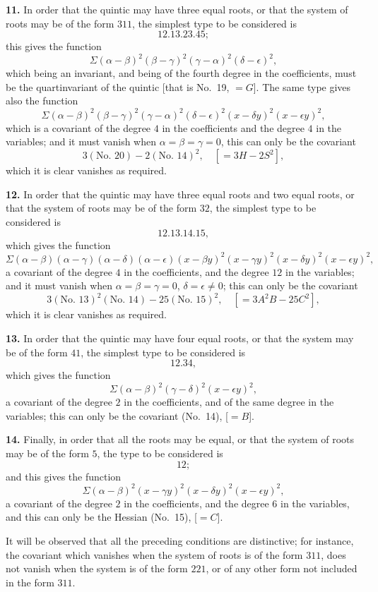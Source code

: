 \documentclass[11pt,a4paper]{book}
\begin{document}
\begin{center}
\medskip
\noindent\textbf{11.} In order that the quintic may have three equal roots, or that the system of roots may be of the form $311$, the simplest type to be considered is
\[12.13.23.45;\]
this gives the function
\[
\Sigma(\alpha-\beta)^2(\beta-\gamma)^2(\gamma-\alpha)^2(\delta-\epsilon)^2,
\]
which being an invariant, and being of the fourth degree in the coefficients, must be the quartinvariant of the quintic [that is No.~19, $=G$]. The same type gives also the function
\[
\Sigma(\alpha-\beta)^2(\beta-\gamma)^2(\gamma-\alpha)^2(\delta-\epsilon)^2(x-\delta y)^2(x-\epsilon y)^2,
\]
which is a covariant of the degree $4$ in the coefficients and the degree $4$ in the variables; and it must vanish when $\alpha=\beta=\gamma=0$, this can only be the covariant
\[3(\text{No.~20}) - 2(\text{No.~14})^2, \quad [= 3H - 2S^2],\]
which it is clear vanishes as required.

\medskip
\noindent\textbf{12.} In order that the quintic may have three equal roots and two equal roots, or that the system of roots may be of the form $32$, the simplest type to be considered is
\[12.13.14.15,\]
which gives the function
\[
\Sigma(\alpha-\beta)(\alpha-\gamma)(\alpha-\delta)(\alpha-\epsilon)(x-\beta y)^2(x-\gamma y)^2(x-\delta y)^2(x-\epsilon y)^2,
\]
a covariant of the degree $4$ in the coefficients, and the degree $12$ in the variables; and it must vanish when $\alpha=\beta=\gamma=0$, $\delta=\epsilon\neq 0$; this can only be the covariant
\[3(\text{No.~13})^2(\text{No.~14}) - 25(\text{No.~15})^2, \quad [= 3A^2B - 25C^2],\]
which it is clear vanishes as required.

\medskip
\noindent\textbf{13.} In order that the quintic may have four equal roots, or that the system may be of the form $41$, the simplest type to be considered is
\[12.34,\]
which gives the function
\[
\Sigma(\alpha-\beta)^2(\gamma-\delta)^2(x-\epsilon y)^2,
\]
a covariant of the degree $2$ in the coefficients, and of the same degree in the variables; this can only be the covariant (No.~14), [$=B$].

\medskip
\noindent\textbf{14.} Finally, in order that all the roots may be equal, or that the system of roots may be of the form $5$, the type to be considered is
\[12;\]
and this gives the function
\[
\Sigma(\alpha-\beta)^2(x-\gamma y)^2(x-\delta y)^2(x-\epsilon y)^2,
\]
a covariant of the degree $2$ in the coefficients, and the degree $6$ in the variables, and this can only be the Hessian (No.~15), [$=C$].

It will be observed that all the preceding conditions are distinctive; for instance, the covariant which vanishes when the system of roots is of the form $311$, does not vanish when the system is of the form $221$, or of any other form not included in the form $311$.


\end{center}
\end{document}
